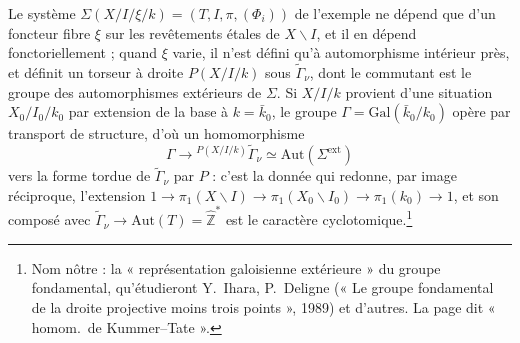 \documentclass[11pt,a4paper]{article}
\begin{document}
Le système $\Sigma(X/I/\xi/k) = (T, I, \pi, (\Phi_{i}))$ de l'exemple ne dépend
que d'un foncteur fibre $\xi$ sur les revêtements étales de $X \smallsetminus
I$, et il en dépend fonctoriellement ; quand $\xi$ varie, il n'est défini qu'à
automorphisme intérieur près, et définit un torseur à droite $P(X/I/k)$ sous
$\widetilde{\Gamma}_{\nu}$, dont le commutant est le groupe des automorphismes
extérieurs de $\Sigma$. Si $X/I/k$ provient d'une situation $X_{0}/I_{0}/k_{0}$
par extension de la base à $k = \bar{k}_{0}$, le groupe $\Gamma =
\mathrm{Gal}(\bar{k}_{0}/k_{0})$ opère par transport de structure, d'où un
homomorphisme
\[
\Gamma \longrightarrow {}^{P(X/I/k)}\widetilde{\Gamma}_{\nu} \simeq
\mathrm{Aut}(\Sigma^{\mathrm{ext}})
\]
vers la forme tordue de $\widetilde{\Gamma}_{\nu}$ par $P$ : c'est la donnée qui
redonne, par image réciproque, l'extension $1 \to \pi_{1}(X \smallsetminus I) \to
\pi_{1}(X_{0} \smallsetminus I_{0}) \to \pi_{1}(k_{0}) \to 1$, et son composé avec
$\widetilde{\Gamma}_{\nu} \to \mathrm{Aut}(T) = \widehat{\mathbb{Z}}^{*}$ est le
caractère cyclotomique.\footnote{Nom nôtre : la « représentation galoisienne
extérieure » du groupe fondamental, qu'étudieront Y.~Ihara, P.~Deligne
(« Le groupe fondamental de la droite projective moins trois points », 1989)
et d'autres. La page dit « homom.\ de Kummer--Tate ».}
\end{document}
